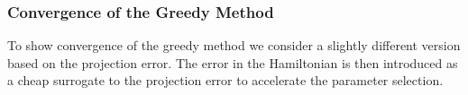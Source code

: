 





\subsubsection{Convergence of the Greedy Method} \label{chap:SyMo.PrSy:3}

To show convergence of the greedy method we {\edit consider} a slightly different version based on the projection error. The error in the Hamiltonian is then introduced as a cheap surrogate to the projection error to accelerate the parameter selection.

